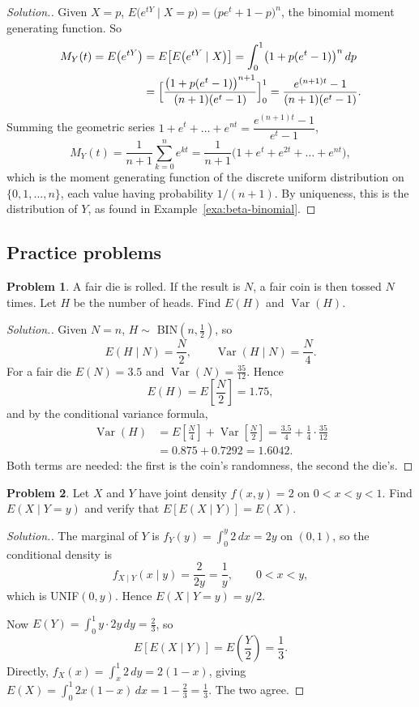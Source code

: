 \documentclass[11pt,a4paper]{article}
\theoremstyle{definition}
\newtheorem{problemx}{Problem}[subsection]
\newenvironment{problem}{\begin{problemx}}{\end{problemx}}
\newenvironment{solution}
  {\renewcommand{\qedsymbol}{}\begin{proof}[\textit{Solution}.]}
  {\end{proof}}
\DeclareMathOperator{\Var}{Var}
\begin{document}
\begin{solution}
Given $X = p$, $E\bigl(e^{tY} \mid X = p\bigr) = \bigl(pe^t + 1 - p\bigr)^n$, the binomial moment generating function. So
\begin{align*}
M_Y(t) = E\bigl(e^{tY}\bigr) &= E\bigl[E\bigl(e^{tY} \mid X\bigr)\bigr] = \int_0^1\bigl(1 + p(e^t - 1)\bigr)^n\,dp \\
&= \Bigl[\frac{\bigl(1 + p(e^t - 1)\bigr)^{n+1}}{(n + 1)(e^t - 1)}\Bigr]_0^1 = \frac{e^{(n+1)t} - 1}{(n + 1)(e^t - 1)} .
\end{align*}
Summing the geometric series $1 + e^t + \dots + e^{nt} = \dfrac{e^{(n+1)t} - 1}{e^t - 1}$,
\[
M_Y(t) = \frac{1}{n + 1}\sum_{k=0}^ne^{kt} = \frac{1}{n + 1}\bigl(1 + e^t + e^{2t} + \dots + e^{nt}\bigr) ,
\]
which is the moment generating function of the discrete uniform distribution on $\{0, 1, \dots, n\}$, each value having probability $1/(n + 1)$. By
uniqueness, this is the distribution of $Y$, as found in Example~\ref{exa:beta-binomial}.
\end{solution}

\subsection{Practice problems}

\begin{problem}
A fair die is rolled. If the result is $N$, a fair coin is then tossed $N$
times. Let $H$ be the number of heads. Find $E(H)$ and $\Var(H)$.
\end{problem}
\begin{solution}
Given $N=n$, $H\sim$ BIN$\left(n,\tfrac12\right)$, so
$$E\left(H\mid N\right) = \frac{N}{2},\qquad
\Var\left(H\mid N\right) = \frac{N}{4}.$$
For a fair die $E(N) = 3.5$ and $\Var(N) = \tfrac{35}{12}$. Hence
$$E(H) = E\left[\frac{N}{2}\right] = 1.75 ,$$
and by the conditional variance formula,
\begin{align*}
\Var(H) &= E\left[\frac{N}{4}\right] + \Var\left[\frac{N}{2}\right]
= \frac{3.5}{4} + \frac{1}{4}\cdot\frac{35}{12} \\
&= 0.875 + 0.7292 = 1.6042 .
\end{align*}
Both terms are needed: the first is the coin's randomness, the second the die's.
\end{solution}

\begin{problem}
Let $X$ and $Y$ have joint density $f(x,y) = 2$ on $0<x<y<1$. Find
$E\left(X\mid Y=y\right)$ and verify that $E\left[E\left(X\mid Y\right)\right] = E(X)$.
\end{problem}
\begin{solution}
The marginal of $Y$ is $f_Y(y) = \int_0^{y}2\,dx = 2y$ on $(0,1)$, so the
conditional density is
$$f_{X\mid Y}(x\mid y) = \frac{2}{2y} = \frac{1}{y},\qquad 0<x<y,$$
which is UNIF$(0,y)$. Hence $E\left(X\mid Y=y\right) = y/2$.

Now $E(Y) = \int_0^{1}y\cdot 2y\,dy = \tfrac23$, so
$$E\left[E\left(X\mid Y\right)\right] = E\left(\frac{Y}{2}\right) = \frac13 .$$
Directly, $f_X(x) = \int_x^{1}2\,dy = 2(1-x)$, giving
$E(X) = \int_0^{1}2x(1-x)\,dx = 1 - \tfrac23 = \tfrac13$. The two agree.
\end{solution}
\end{document}
